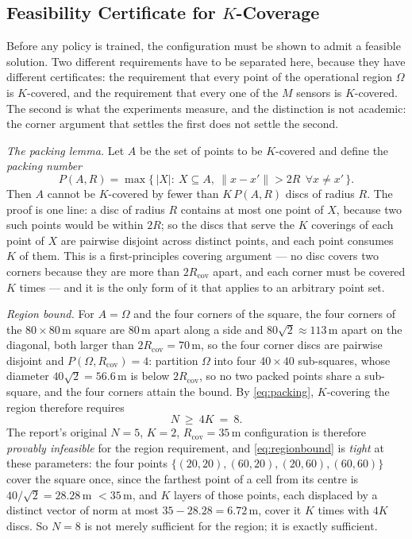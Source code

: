 \documentclass[conference]{IEEEtran}
\begin{document}
\subsection{Feasibility Certificate for \texorpdfstring{$K$}{K}-Coverage}
\label{sec:feasibility}

Before any policy is trained, the configuration must be shown to admit a
feasible solution.  Two different requirements have to be separated here,
because they have different certificates: the requirement that every point
of the operational region $\Omega$ is $K$-covered, and the requirement that
every one of the $M$ sensors is $K$-covered.  The second is what the
experiments measure, and the distinction is not academic: the corner
argument that settles the first does not settle the second.

\emph{The packing lemma.} Let $A$ be the set of points to be $K$-covered and
define the \emph{packing number}
\begin{equation}
P(A,R)=\max\bigl\{\,|X|:\ X\subseteq A,\ \|x-x'\|>2R\ \ \forall x\neq x'\,\bigr\}.
\label{eq:packing}
\end{equation}
Then $A$ cannot be $K$-covered by fewer than $K\,P(A,R)$ discs of radius
$R$.  The proof is one line: a disc of radius $R$ contains at most one
point of $X$, because two such points would be within $2R$; so the discs
that serve the $K$ coverings of each point of $X$ are pairwise disjoint
across distinct points, and each point consumes $K$ of them.  This is a
first-principles covering argument --- no disc covers two corners because
they are more than $2R_{\mathrm{cov}}$ apart, and each corner must be
covered $K$ times --- and it is the only form of it that applies to an
arbitrary point set.

\emph{Region bound.} For $A=\Omega$ and the four corners of the square,
the four corners of the $80\times80$\,m square are $80$\,m apart along a side and $80\sqrt2\approx113$\,m apart on the diagonal, both larger than $2R_{\mathrm{cov}}=70$\,m, so the four corner discs are pairwise disjoint and $P(\Omega,R_{\mathrm{cov}})=4$: partition $\Omega$ into four $40\times40$ sub-squares, whose diameter $40\sqrt2=56.6$\,m is below $2R_{\mathrm{cov}}$, so no two packed points share a sub-square, and the four corners attain the bound.  By \eqref{eq:packing}, $K$-covering the region therefore requires
\begin{equation}
N\ \ge\ 4K\ =\ 8 .
\label{eq:regionbound}
\end{equation}
The report's original $N=5$, $K=2$, $R_{\mathrm{cov}}=35$\,m configuration
is therefore \emph{provably infeasible} for the region requirement, and
\eqref{eq:regionbound} is \emph{tight} at these parameters: the four points
$\{(20,20),(60,20),(20,60),(60,60)\}$ cover the square once, since the
farthest point of a cell from its centre is $40/\sqrt2=28.28$\,m $<35$\,m,
and $K$ layers of those points, each displaced by a distinct vector of
norm at most $35-28.28=6.72$\,m, cover it $K$ times with $4K$ discs.  So
$N=8$ is not merely sufficient for the region; it is exactly sufficient.
\end{document}
